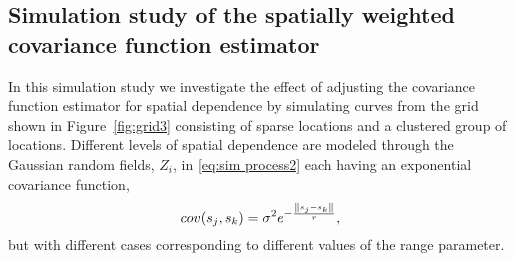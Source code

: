 \subsection{Simulation study of the spatially weighted covariance function estimator} %
\label{sub:simulation covariance}




%
%
%

In this simulation study we investigate the effect of adjusting the covariance function estimator for spatial dependence by simulating curves from the grid shown in Figure~\ref{fig:grid3} consisting of sparse locations and a clustered group of locations. Different levels of spatial dependence are modeled through the Gaussian random fields, $Z_i$, in \eqref{eq:sim process2} each having an exponential covariance function, 
\begin{equation}
	cov(s_j, s_k) = \sigma^2e^{-\frac{\left\|s_j - s_k\right\|}{r}},\label{eq:exp cov}
\end{equation}
but with different cases corresponding to different values of the range parameter. 

